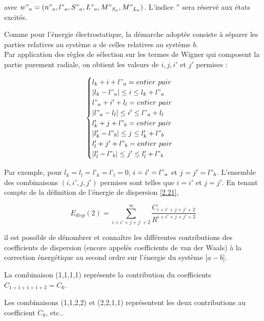 	\noindent avec $w"_{a} = (n"_{a}, l"_{a}, S"_{a}, L"_{a}, M"_{S_{a}}, M"_{L_{a}})$. L'indice \og $"$ \fg{} sera réservé aux états excités. 
	
	Comme pour l'énergie électrostatique, la démarche adoptée consiste à séparer les parties relatives au système $a$ de celles relatives au système $b$. \\
	
	Par application des règles de sélection sur les termes de Wigner qui composent la partie purement radiale, on obtient les valeurs de $i, j, i'$ et $j'$ permises :
	
	\begin{equation}
	\begin{cases}
	l_{k} + i + l"_{a} = entier\ pair \\
	|l_{k} - l"_{a}| \leq i \leq l_{k} + l"_{a} \\
	l"_{a} + i' + l_{l} = entier\ pair \\
	|l"_{a} - l_{l}| \leq i' \leq l"_{a} + l_{l} \\
	l'_{k} + j + l"_{b} = entier\ pair \\
	|l'_{k} - l"_{b}| \leq j \leq l'_{k} + l"_{b} \\
	l'_{l} + j' + l"_{b} = entier\ pair \\
	|l'_{l} - l"_{b}| \leq j' \leq l'_{l} + l"_{b}
	\end{cases}
	\end{equation}
	
	Par exemple, pour $l_{k}=l_{l}=l’_{k}=l’_{l}=0$, $i=i'=l"_{a}$ et $j=j'=l"_{b}$. L'ensemble des combinaisons $(i, i', j, j')$ permises sont telles que $i=i'$ et $j=j'$. En tenant compte de la définition de l'énergie de dispersion \ref{2.21},
	
	\begin{equation}
	E_{disp}(2) = \sum_{i+i'+j+j'+2}^{\infty} \frac{C_{i+i'+j+j'+2}}{R^{i+i'+j+j'+2}}
	\end{equation}
	
	il est possible de dénombrer et connaître les différentes contributions des coefficients de dispersion (encore appelés coefficients de van der Waals) à la correction énergétique au second ordre sur l'énergie du système [$a - b$].
	
	La combinaison (1,1,1,1) représente la contribution du coefficients $C_{1+1+1+1+2} = C_{6}$.
	
	Les combinaisons (1,1,2,2) et (2,2,1,1) représentent les deux contributions au coefficient $C_{8}$, etc..
	
